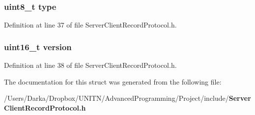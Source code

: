 \subsubsection[{type}]{\setlength{\rightskip}{0pt plus 5cm}uint8\+\_\+t type}\label{structrecord_a1d127017fb298b889f4ba24752d08b8e}


Definition at line 37 of file Server\+Client\+Record\+Protocol.\+h.

\subsubsection[{version}]{\setlength{\rightskip}{0pt plus 5cm}uint16\+\_\+t version}\label{structrecord_ab6d7b6f8c2ceaba7acda80aaf05f4899}


Definition at line 38 of file Server\+Client\+Record\+Protocol.\+h.



The documentation for this struct was generated from the following file\+:\begin{DoxyCompactItemize}
\item 
/\+Users/\+Darka/\+Dropbox/\+U\+N\+I\+T\+N/\+Advanced\+Programming/\+Project/include/{\bf Server\+Client\+Record\+Protocol.\+h}\end{DoxyCompactItemize}
